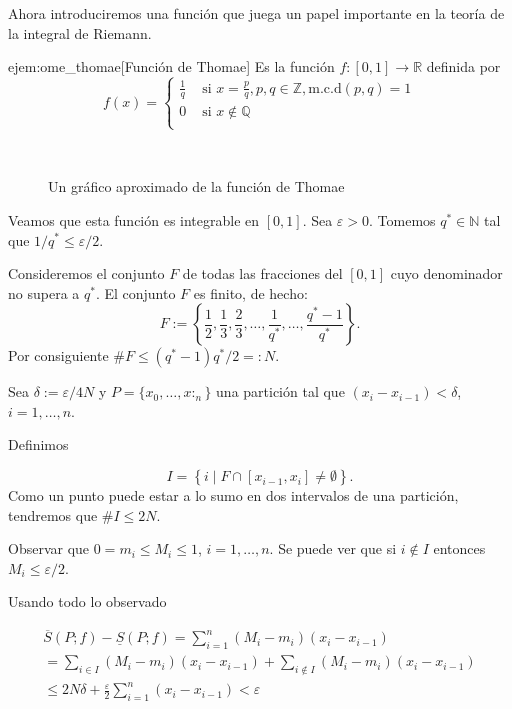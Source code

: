 Ahora introduciremos una función que juega un papel importante en la teoría de la integral de Riemann.

\begin{ejemplo}{ejem:ome_thomae}[Función de Thomae] Es la función $f:[0,1]\to\mathbb{R}$ definida por 
\[
 f(x)=\begin{cases} \frac{1}{q} & \text{ si } x=\frac{p}{q},p,q\in\mathbb{Z}, \text{m.c.d}(p,q)=1
 \\0 & \text{ si }   x\notin\mathbb{Q}\\
\end{cases}
\]

\begin{figure}[H]
\\
\caption{Un gráfico aproximado de la función de Thomae}
\end{figure}

Veamos que esta función es integrable en $[0,1]$. Sea $\varepsilon>0$. Tomemos $q^*\in\mathbb{N}$ tal que $1/q^*\leq \varepsilon/2$.  

Consideremos el conjunto $F$ de todas las fracciones del $[0,1]$ cuyo denominador no supera a $q^*$. El conjunto $F$  es finito,  de hecho:
\begin{equation}\label{eq:conj_F}
  F:=\left\{\frac12,\frac13,\frac23,\ldots,\frac{1}{q^*},\ldots,\frac{q^*-1}{q^*} \right\}.
\end{equation}
Por consiguiente $\#F\leq (q^*-1)q^*/2=:N$.  

Sea $\delta:=\varepsilon/4N$ y $P=\{x_0,\ldots,x:_n\}$ una partición tal que $(x_i-x_{i-1})<\delta$, $i=1,\ldots,n$. 

Definimos
  
  \[
   I =\left\{i\mid F\cap  [x_{i-1},x_i]\neq\emptyset  \right \}.
  \]
  Como un punto puede estar a lo sumo en dos intervalos de una partición, tendremos que $\# I \leq 2N.$



Observar que $0=m_i\leq M_i\leq 1 $, $i=1,\ldots,n$. Se puede ver que si $i\not \in    I $ entonces $M_i\leq \varepsilon/2$.


Usando todo lo observado 

\begin{multline*}
 \overline{S}(P;f)-\underline{S}(P;f)=\sum_{i=1}^n(M_i-m_i)(x_i-x_{i-1})\\ =\sum_{i\in I}(M_i-m_i)(x_i-x_{i-1})+\sum_{i\notin I} (M_i-m_i)(x_i-x_{i-1})\\
 \leq 2N\delta+\frac{\varepsilon}{2}\sum_{i=1}^n(x_i-x_{i-1})<\varepsilon
\end{multline*}
    

\end{ejemplo}



